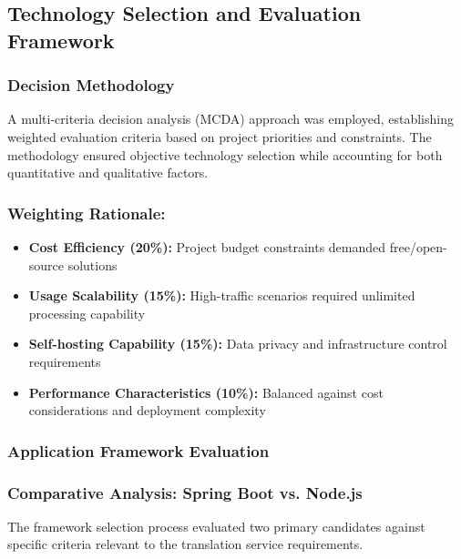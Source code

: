 \subsection{Technology Selection and Evaluation Framework}

\subsubsection{Decision Methodology}

A multi-criteria decision analysis (MCDA) approach was employed, establishing weighted evaluation criteria based on project priorities and constraints. The methodology ensured objective technology selection while accounting for both quantitative and qualitative factors.

\subsubsection{Weighting Rationale:}
\begin{itemize}
    \item \textbf{Cost Efficiency (20\%):} Project budget constraints demanded free/open-source solutions
    \item \textbf{Usage Scalability (15\%):} High-traffic scenarios required unlimited processing capability
    \item \textbf{Self-hosting Capability (15\%):} Data privacy and infrastructure control requirements
    \item \textbf{Performance Characteristics (10\%):} Balanced against cost considerations and deployment complexity
\end{itemize}

\subsubsection{Application Framework Evaluation}

\subsubsection{Comparative Analysis: Spring Boot vs. Node.js}

The framework selection process evaluated two primary candidates against specific criteria relevant to the translation service requirements.

